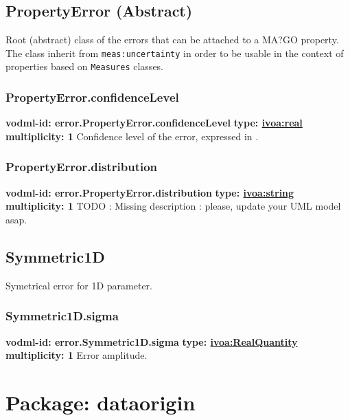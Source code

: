   \subsection{PropertyError (Abstract)}
  \label{sect:error.PropertyError}
    Root (abstract) class of the errors that can be attached to a MA?GO property. The class inherit from \texttt{meas:uncertainty} in order to be usable in the context of properties based on \texttt{Measures} classes.

    \subsubsection{PropertyError.confidenceLevel}
      \textbf{vodml-id: error.PropertyError.confidenceLevel} \newline
      \textbf{type: \hyperref[sect:ivoa]{ivoa:real}} \newline
      \textbf{multiplicity: 1} \newline
      Confidence level of the error, expressed in \sigma.

    \subsubsection{PropertyError.distribution}
      \textbf{vodml-id: error.PropertyError.distribution} \newline
      \textbf{type: \hyperref[sect:ivoa]{ivoa:string}} \newline
      \textbf{multiplicity: 1} \newline
      TODO : Missing description : please, update your UML model asap.

  \subsection{Symmetric1D}
  \label{sect:error.Symmetric1D}
    Symetrical error for 1D parameter.

    \subsubsection{Symmetric1D.sigma}
      \textbf{vodml-id: error.Symmetric1D.sigma} \newline
      \textbf{type: \hyperref[sect:ivoa]{ivoa:RealQuantity}} \newline
      \textbf{multiplicity: 1} \newline
      Error amplitude.

\pagebreak
\section{Package: dataorigin }

